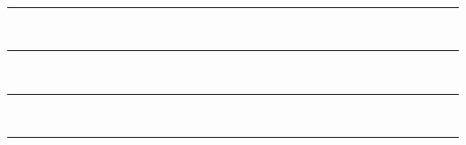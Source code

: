 \thispagestyle{empty}
\begin{center}
  \renewcommand*{\familydefault}{\defaultFont}
  \fontsize{10.5pt}{11pt}\selectfont%
  \textbf{
  \reportTitle\\%
  }
\vspace{7pt} {%
  \begin{spacing}{0.05}
    \rule{200pt}{2pt}\\
    \rule{200pt}{0.75pt}\\
  \end{spacing}
  \renewcommand*{\familydefault}{\defaultFont}
  \fontsize{12.5pt}{13pt}\selectfont%
  \vspace{7pt}
  \textbf{\reportAuthor}
  \vspace{5pt}
  \begin{spacing}{0.05}
    \rule{200pt}{0.75pt}\\
    \rule{200pt}{2pt}\\
  \end{spacing}
}
\end{center}

